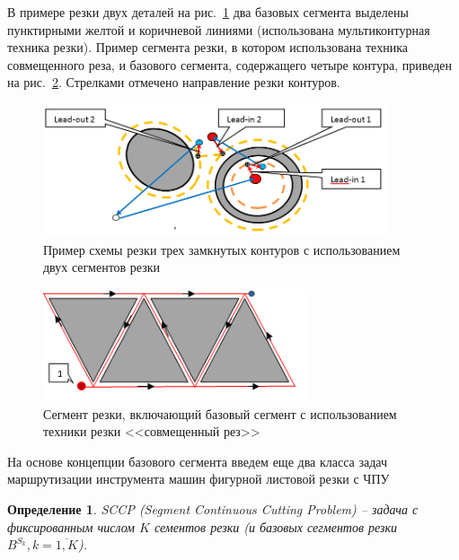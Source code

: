 \documentclass[11pt,twoside,openany]{report}
\newcounter{lem}
\newcounter{theo}
\newcounter{pred}
\newcounter{opred}
\newtheorem{opred}{Определение}[section]
\begin{document}
В примере резки двух деталей
на рис.~\ref{cut2-1}
два базовых сегмента выделены пунктирными
желтой и коричневой линиями
(использована мультиконтурная техника резки).
Пример сегмента резки, в котором использована техника совмещенного реза,
и базового сегмента, содержащего четыре контура,
приведен на рис.~\ref{cut4-3}.
Стрелками отмечено направление резки контуров.

\begin{figure}[h]
  \begin{center}
  \includegraphics[width=0.9\textwidth]{cut2-1.png}
  \caption{Пример схемы резки трех замкнутых контуров с использованием двух сегментов резки}
  \label{cut2-1}
  \end{center}
\end{figure}

\begin{figure}[h]
  \begin{center}
  \includegraphics[width=0.7\textwidth]{cut4-3.png}
  \caption{Сегмент резки, включающий базовый сегмент с использованием техники резки <<совмещенный рез>>}
  \label{cut4-3}
  \end{center}
\end{figure}

На основе концепции базового сегмента введем еще
два класса задач маршрутизации инструмента машин
фигурной листовой резки с ЧПУ

\begin{opred}
  \label{def:SCCP}
  {\it SCCP (Segment Continuous Cutting Problem)}
  --
  задача с фиксированным числом $K$
  сементов резки
  (и базовых сегментов резки
  $B^{S_k}, k = \overline{1, K}$).
\end{opred}
\end{document}
